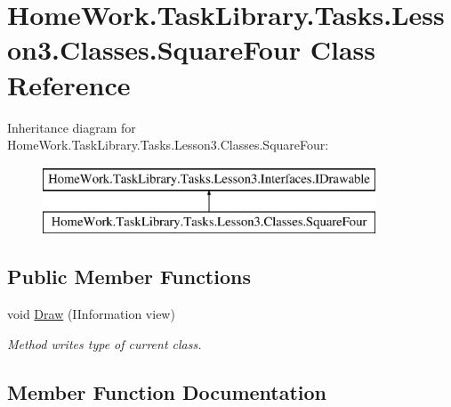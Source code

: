 \hypertarget{class_home_work_1_1_task_library_1_1_tasks_1_1_lesson3_1_1_classes_1_1_square_four}{}\section{Home\+Work.\+Task\+Library.\+Tasks.\+Lesson3.\+Classes.\+Square\+Four Class Reference}
\label{class_home_work_1_1_task_library_1_1_tasks_1_1_lesson3_1_1_classes_1_1_square_four}
Inheritance diagram for Home\+Work.\+Task\+Library.\+Tasks.\+Lesson3.\+Classes.\+Square\+Four\+:\begin{figure}[H]
\begin{center}
\leavevmode
\includegraphics[height=2.000000cm]{class_home_work_1_1_task_library_1_1_tasks_1_1_lesson3_1_1_classes_1_1_square_four}
\end{center}
\end{figure}
\subsection*{Public Member Functions}
\begin{DoxyCompactItemize}
\item 
void \mbox{\hyperlink{class_home_work_1_1_task_library_1_1_tasks_1_1_lesson3_1_1_classes_1_1_square_four_ab98dd68e8b6002eeddae5df4168e4633}{Draw}} (I\+Information view)
\begin{DoxyCompactList}\small\item\em Method writes type of current class. \end{DoxyCompactList}\end{DoxyCompactItemize}


\subsection{Member Function Documentation}
\mbox{\label{class_home_work_1_1_task_library_1_1_tasks_1_1_lesson3_1_1_classes_1_1_square_four_ab98dd68e8b6002eeddae5df4168e4633}} 
